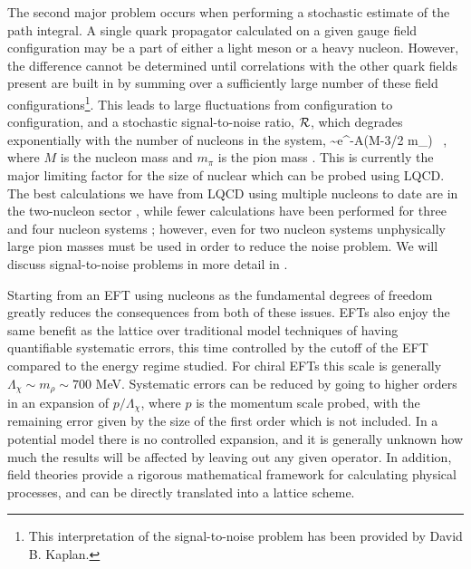 The second major problem occurs when performing a stochastic estimate of the path integral. A single quark propagator calculated on a given gauge field configuration may be a part of either a light meson or a heavy nucleon. However, the difference cannot be determined until correlations with the other quark fields present are built in by summing over a sufficiently large number of these field configurations\footnote{This interpretation of the signal-to-noise problem has been provided by David B. Kaplan.}. This leads to large fluctuations from configuration to configuration, and a stochastic signal-to-noise ratio, ${\mathcal{ R}}$, which degrades exponentially with the number of nucleons in the system,
\beq
\calR \sim e^{-A(M-3/2 m_{\pi})\tau} \ ,
\eeq
where $M$ is the nucleon mass and $m_{\pi}$ is the pion mass \cite{Lepage:1989hd}. This is currently the major limiting factor for the size of nuclear which can be probed using LQCD. The best calculations we have from LQCD using multiple nucleons to date are in the two-nucleon sector \cite{Berkowitz:2015eaa,Kurth:2015cvl,Nicholson:2015pys,Orginos:2015aya,Detmold:2015daa,Chang:2015qxa,Beane:2015yha,Beane:2014sda,Beane:2014ora,Beane:2013br,Beane:2012vq,Beane:2011iw,Beane:2009py,Yamazaki:2015vjn,Yamazaki:2015asa,Yamazaki:2013rna,Yamazaki:2012fn,Yamazaki:2012hi,Doi:2015uvd,Doi:2015oha,Ishii:2006ec,Murano:2013xxa,Aoki:2014mia,Murano:2013gta,HALQCD:2012aa,Inoue:2010hs}, while fewer calculations have been performed for three and four nucleon systems \cite{Beane:2009gs,Beane:2012vq,Beane:2014ora,Beane:2014sda,Chang:2015qxa,Yamazaki:2015vjn,Yamazaki:2015asa,Yamazaki:2013rna,Yamazaki:2012fn,Yamazaki:2012hi,Doi:2011gq}; however, even for two nucleon systems unphysically large pion masses must be used in order to reduce the noise problem. We will discuss signal-to-noise problems in more detail in . 

Starting from an EFT using nucleons as the fundamental degrees of freedom greatly reduces the consequences from both of these issues. EFTs also enjoy the same benefit as the lattice over traditional model techniques of having quantifiable systematic errors, this time controlled by the cutoff of the EFT compared to the energy regime studied. For chiral EFTs this scale is generally $\Lambda_{\chi} \sim m_{\rho} \sim 700$ MeV. Systematic errors can be reduced by going to higher orders in an expansion of $p/\Lambda_{\chi}$, where $p$ is the momentum scale probed, with the remaining error given by the size of the first order which is not included. In a potential model there is no controlled expansion, and it is generally unknown how much the results will be affected by leaving out any given operator. In addition, field theories provide a rigorous mathematical framework for calculating physical processes, and can be directly translated into a lattice scheme.

